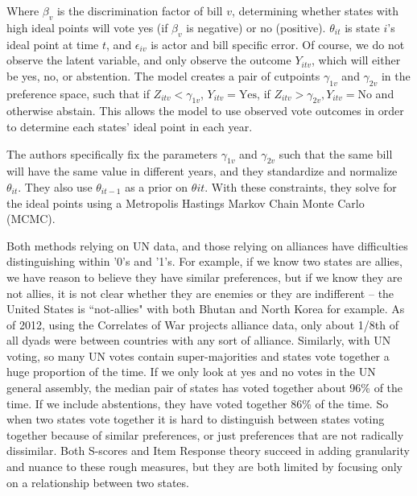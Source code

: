 \noindent Where $\beta_{v}$ is the discrimination factor of bill $v$, determining whether states with high ideal points will vote yes (if $\beta_{v}$ is negative) or no (positive). $\theta_{it}$ is state $i$'s ideal point at time $t$, and $\epsilon_{iv}$ is actor and bill specific error. Of course, we do not observe the latent variable, and only observe the outcome $Y_{itv}$, which will either be yes, no, or abstention. The model creates a pair of cutpoints $\gamma_{1v}$ and $\gamma_{2v}$ in the preference space, such that  if $Z_{itv} < \gamma_{1v}$, $Y_{itv} = \text{Yes}$, if $Z_{itv} > \gamma_{2v}, Y_{itv} = \text{No}$ and otherwise abstain. This allows the model to use observed vote outcomes in order to determine each states' ideal point in each year.

The authors specifically fix the parameters $\gamma_{1v}$ and $\gamma_{2v}$ such that the same bill will have the same value in different years, and they standardize and normalize $\theta_{it}$. They also use $\theta_{it-1}$ as a prior on $\theta{it}$. With these constraints, they solve for the ideal points using a Metropolis Hastings Markov Chain Monte Carlo (MCMC).

Both methods relying on UN data, and those relying on alliances have difficulties distinguishing within '0's and '1's. For example, if we know two states are allies, we have reason to believe they have similar preferences, but if we know they are not allies, it is not clear whether they are enemies or they are indifferent -- the United States is ``not-allies" with both Bhutan and North Korea for example. As of 2012, using the Correlates of War projects alliance data, only about 1/8th of all dyads were between countries with any sort of alliance. Similarly, with UN voting, so many UN votes contain super-majorities and states vote together a huge proportion of the time. If we only look at yes and no votes in the UN general assembly, the median pair of states has voted together about 96\% of the time. If we include abstentions,  they have voted together 86\% of the time. So when two states vote together it is hard to distinguish between states voting together because of similar preferences, or just preferences that are not radically dissimilar. Both S-scores and Item Response theory succeed in adding granularity and nuance to these rough measures, but they are both limited by focusing only on a relationship between two states. 


